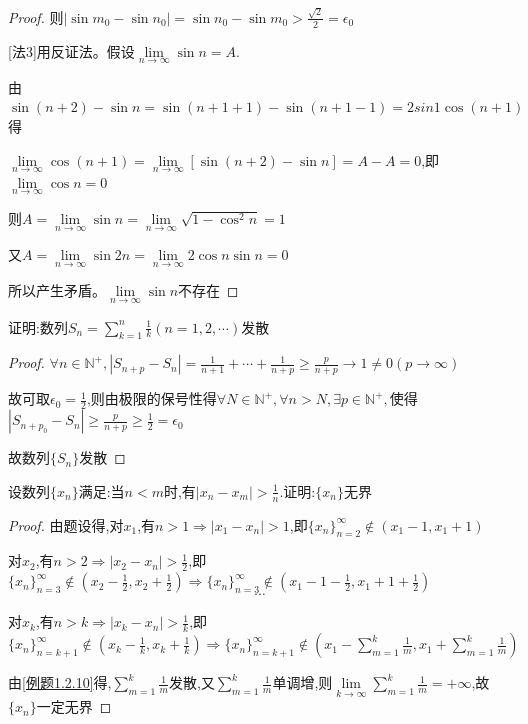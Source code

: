 \begin{proof}
    则$|\sin m_0-\sin n_0|=\sin n_0-\sin m_0>\frac{\sqrt{2}}{2}=\epsilon_0$

    [法3]用反证法。假设$\lim \limits_{n \to \infty} \sin n=A$.
    
    由$\sin(n+2)-\sin n=\sin(n+1+1)-\sin (n+1-1)=2sin 1 \cos (n+1)$得
    
    $\lim \limits_{n \to \infty} \cos (n+1)=\lim \limits_{n \to \infty} [\sin(n+2)-\sin n]=A-A=0$,即$\lim \limits_{n \to \infty} \cos n = 0$

    则$A=\lim \limits_{n \to \infty} \sin n = \lim \limits_{n \to \infty} \sqrt{1-\cos^2 n} = 1$

    又$A=\lim \limits_{n \to \infty} \sin 2n=\lim \limits_{n \to \infty} 2\cos n \sin n = 0$

    所以产生矛盾。$\lim \limits_{n \to \infty} \sin n$不存在
\end{proof}



\begin{example}\label{例题1.2.10}
    证明:数列$S_n=\sum\limits_{k=1}^{n} \frac{1}{k}(n=1,2,\cdots)$发散
\end{example}

\begin{proof}
    
    $\forall n\in \mathbb{N}^+,|S_{n+p}-S_n|=\frac{1}{n+1}+\cdots+\frac{1}{n+p}\ge \frac{p}{n+p} \to 1 \ne 0(p \to \infty)$

    故可取$\epsilon_0=\frac{1}{2}$,则由极限的保号性得$\forall N\in \mathbb{N}^+,\forall n>N,\exists p\in \mathbb{N}^+,$使得$|S_{n+p_0}-S_{n}|\ge \frac{p}{n+p}\ge \frac{1}{2}=\epsilon_0$
    
    故数列$\{S_n\}$发散
\end{proof}

\begin{practice}
    设数列$\{x_n\}$满足:当$n<m$时,有$|x_n-x_m|>\frac{1}{n}$.证明:$\{x_n\}$无界
\end{practice}

\begin{proof}

    由题设得,对$x_1$,有$n>1 \Longrightarrow |x_1-x_n|>1$,即$\{x_n\}_{n=2}^\infty \notin (x_1-1,x_1+1)$

    对$x_2$,有$n>2 \Longrightarrow |x_2-x_n|>\frac{1}{2}$,即$\{x_n\}_{n=3}^\infty \notin (x_2-\frac{1}{2},x_2+\frac{1}{2}) \Longrightarrow \{x_n\}_{n=3}^\infty \notin (x_1-1-\frac{1}{2},x_1+1+\frac{1}{2})$
    $$\cdots$$

    对$x_k$,有$n>k \Longrightarrow |x_k-x_n|>\frac{1}{k}$,即$\{x_n\}_{n=k+1}^\infty \notin (x_k-\frac{1}{k},x_k+\frac{1}{k}) \Longrightarrow \{x_n\}_{n=k+1}^\infty \notin (x_1-\sum\limits_{m=1}^{k} \frac{1}{m} ,x_1+\sum\limits_{m=1}^{k} \frac{1}{m})$

    由\cref{例题1.2.10}得,$\sum\limits_{m=1}^{k} \frac{1}{m}$发散,又$\sum\limits_{m=1}^{k} \frac{1}{m}$单调增,则$\lim \limits_{k \to \infty} \sum\limits_{m=1}^{k} \frac{1}{m}=+\infty$,故$\{x_n\}$一定无界
\end{proof}


